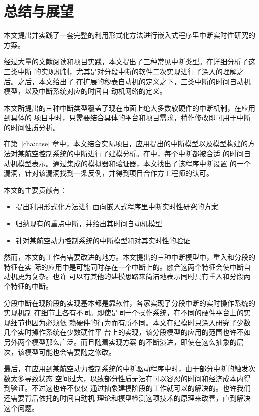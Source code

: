 
\chapter{总结与展望}
\label{cha:sum}

本文提出并实践了一套完整的利用形式化方法进行嵌入式程序里中断实时性研究的方案。

经过大量的文献阅读和项目实践，本文提出了三种常见中断类型。在详细分析了这三类中断
的实现机制，尤其是对分段中断的软件二次实现进行了深入的理解之后。之后，本文给出了
在扩展的秒表自动机的定义之下，三类中断的时间自动机模型，以及中断系统对应的时间自
动机网络的定义。

本文所提出的三种中断类型覆盖了现在市面上绝大多数软硬件的中断机制，在应用到具体的
项目中时，只需要结合具体的平台和项目需求，稍作修改即可用于中断的时间性质分析。

在第~\ref{cha:case} 章中，本文结合实际项目，应用提出的中断模型以及模型构建的方
法对某航空控制系统的中断进行了建模分析。在\uppaal 中，每个中断都被合适
的时间自动机模型表示。通过\uppaal 集成的模拟器和验证器，本文找出了该程序中断设置
的一个漏洞，针对该漏洞找到一条反例，并得到项目合作方工程师的认可。

本文的主要贡献有：

\begin{itemize}
	\item 提出利用形式化方法进行面向嵌入式程序里中断实时性研究的方案
	\item 归纳现有的重点中断，并给出其时间自动机模型
	\item 针对某航空动力控制系统的中断模型和对其实时性的验证
\end{itemize}

然而，本文的工作有需要改进的地方。本文提出的三种中断模型中，重入和分段的特征在实
际的应用中是可能同时存在一个中断上的。融合这两个特征会使中断自动机更为复杂。也许
可以有其他的建模思路来简洁地表示同时具有重入和分段两个特征的中断。

分段中断在现阶段的实现基本都是靠软件，各家实现了分段中断的实时操作系统的实现机制
在细节上各有不同。即使是同一个操作系统，在不同的硬件平台上的实现细节也因为必须依
赖硬件的行为而有所不同。本文在建模时只深入研究了少数几个实时操作系统在少数硬件平
台上的实现，该分段模型的应用的范围也许不如另外两个模型那么广泛。而且随着实现方案
的不断演进，即使在这么抽象的层次，该模型可能也会需要随之修改。

最后，在应用到某航空动力控制系统的中断驱动程序中时，由于部分中断的触发次数太多导致状态
空间过大，以致部分性质无法在可以容忍的时间和经济成本内得到验证。不过这也许不仅仅
通过抽象建模阶段的工作就可以的解决的。也许我们还需要\uppaal 背后依托的时间自动机
理论和模型检测这项技术的原理来改善，直到解决这个问题。

